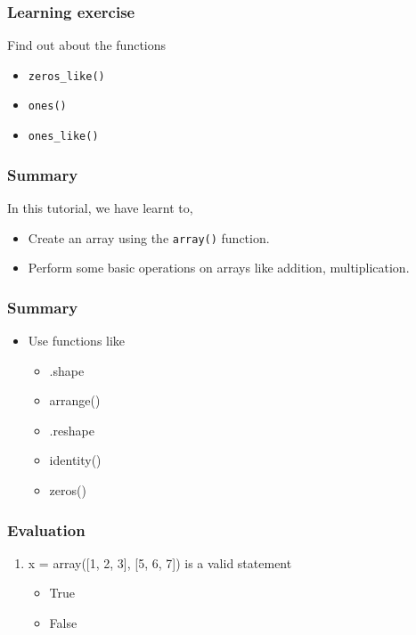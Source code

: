 \documentclass[17pt]{beamer}
\begin{document}
\begin{frame}
\frametitle{Learning exercise}

  Find out about the functions

\begin{itemize}
\item \texttt{zeros\_like()}
\item \texttt{ones()}
\item \texttt{ones\_like()}
\end{itemize}
\end{frame}
\begin{frame}
\frametitle{Summary}

  In this tutorial, we have learnt to,\pause

\begin{itemize}
\item Create an array using the \texttt{array()} function.\pause
\item Perform some basic operations on arrays like addition, multiplication.
\end{itemize}
\end{frame}
\begin{frame}
\frametitle{Summary}

\begin{itemize}

\item Use functions like
\begin{itemize}
	\item .shape
	\item arrange()
	\item .reshape
	\item identity()
	\item zeros() 
\end{itemize}
\end{itemize}
\end{frame}
\begin{frame}
\frametitle{Evaluation}


\begin{enumerate}
\item x = array([1, 2, 3], [5, 6, 7]) is a valid statement
\begin{itemize}
\item True
\item False
\end{itemize}
\end{enumerate}
\end{frame}
\end{document}
